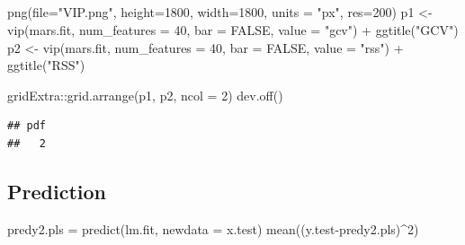 \documentclass[
]{article}
\newenvironment{Shaded}{\begin{snugshade}}{\end{snugshade}}
\newcommand{\AttributeTok}[1]{\textcolor[rgb]{0.77,0.63,0.00}{#1}}
\newcommand{\ConstantTok}[1]{\textcolor[rgb]{0.00,0.00,0.00}{#1}}
\newcommand{\DecValTok}[1]{\textcolor[rgb]{0.00,0.00,0.81}{#1}}
\newcommand{\FunctionTok}[1]{\textcolor[rgb]{0.00,0.00,0.00}{#1}}
\newcommand{\NormalTok}[1]{#1}
\newcommand{\OtherTok}[1]{\textcolor[rgb]{0.56,0.35,0.01}{#1}}
\newcommand{\SpecialCharTok}[1]{\textcolor[rgb]{0.00,0.00,0.00}{#1}}
\newcommand{\StringTok}[1]{\textcolor[rgb]{0.31,0.60,0.02}{#1}}
\begin{document}
\hypertarget{section}{%
\subsection{}\label{section}}

\begin{Shaded}
\begin{Highlighting}[]
\FunctionTok{png}\NormalTok{(}\AttributeTok{file=}\StringTok{"VIP.png"}\NormalTok{, }\AttributeTok{height=}\DecValTok{1800}\NormalTok{, }\AttributeTok{width=}\DecValTok{1800}\NormalTok{, }\AttributeTok{units =} \StringTok{"px"}\NormalTok{, }\AttributeTok{res=}\DecValTok{200}\NormalTok{)}
\NormalTok{p1 }\OtherTok{\textless{}{-}} \FunctionTok{vip}\NormalTok{(mars.fit, }\AttributeTok{num\_features =} \DecValTok{40}\NormalTok{, }\AttributeTok{bar =} \ConstantTok{FALSE}\NormalTok{, }\AttributeTok{value =} \StringTok{"gcv"}\NormalTok{) }\SpecialCharTok{+} \FunctionTok{ggtitle}\NormalTok{(}\StringTok{"GCV"}\NormalTok{)}
\NormalTok{p2 }\OtherTok{\textless{}{-}} \FunctionTok{vip}\NormalTok{(mars.fit, }\AttributeTok{num\_features =} \DecValTok{40}\NormalTok{, }\AttributeTok{bar =} \ConstantTok{FALSE}\NormalTok{, }\AttributeTok{value =} \StringTok{"rss"}\NormalTok{) }\SpecialCharTok{+} \FunctionTok{ggtitle}\NormalTok{(}\StringTok{"RSS"}\NormalTok{)}

\NormalTok{gridExtra}\SpecialCharTok{::}\FunctionTok{grid.arrange}\NormalTok{(p1, p2, }\AttributeTok{ncol =} \DecValTok{2}\NormalTok{)}
\FunctionTok{dev.off}\NormalTok{()}
\end{Highlighting}
\end{Shaded}

\begin{verbatim}
## pdf 
##   2
\end{verbatim}

\hypertarget{prediction}{%
\subsection{Prediction}\label{prediction}}

\begin{Shaded}
\begin{Highlighting}[]
\NormalTok{predy2.pls }\OtherTok{=} \FunctionTok{predict}\NormalTok{(lm.fit, }\AttributeTok{newdata =}\NormalTok{ x.test)}
\FunctionTok{mean}\NormalTok{((y.test}\SpecialCharTok{{-}}\NormalTok{predy2.pls)}\SpecialCharTok{\^{}}\DecValTok{2}\NormalTok{)}
\end{Highlighting}
\end{Shaded}
\end{document}
